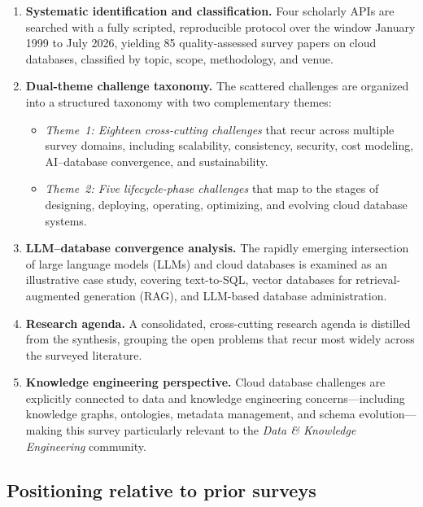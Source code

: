 \documentclass[a4paper,fleqn]{cas-sc}
\begin{document}
\begin{enumerate}[label=\textbf{C\arabic*}]
    \item \textbf{Systematic identification and classification.} Four scholarly APIs are searched with a fully scripted, reproducible protocol over the window January 1999 to July 2026, yielding 85 quality-assessed survey papers on cloud databases, classified by topic, scope, methodology, and venue.

    \item \textbf{Dual-theme challenge taxonomy.} The scattered challenges are organized into a structured taxonomy with two complementary themes:
    \begin{itemize}
        \item \emph{Theme~1: Eighteen cross-cutting challenges} that recur across multiple survey domains, including scalability, consistency, security, cost modeling, AI--database convergence, and sustainability.
        \item \emph{Theme~2: Five lifecycle-phase challenges} that map to the stages of designing, deploying, operating, optimizing, and evolving cloud database systems.
    \end{itemize}

    \item \textbf{LLM--database convergence analysis.} The rapidly emerging intersection of large language models (LLMs) and cloud databases is examined as an illustrative case study, covering text-to-SQL, vector databases for retrieval-augmented generation (RAG), and LLM-based database administration.

    \item \textbf{Research agenda.} A consolidated, cross-cutting research agenda is distilled from the synthesis, grouping the open problems that recur most widely across the surveyed literature.

    \item \textbf{Knowledge engineering perspective.} Cloud database challenges are explicitly connected to data and knowledge engineering concerns---including knowledge graphs, ontologies, metadata management, and schema evolution---making this survey particularly relevant to the \emph{Data \& Knowledge Engineering} community.
\end{enumerate}

\subsection{Positioning relative to prior surveys}
\label{subsec:positioning}
\end{document}
